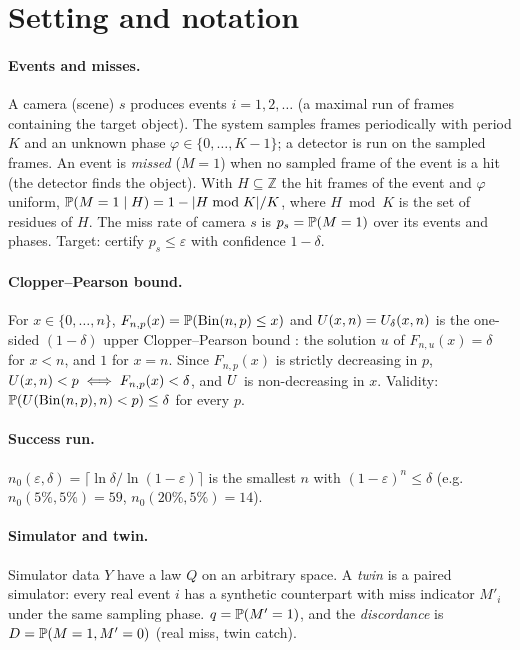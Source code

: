 \section{Setting and notation}\label{sec:setting}

\paragraph{Events and misses.} A camera (scene) $s$ produces events $i=1,2,\dots$ (a maximal run of frames containing
the target object). The system samples frames periodically with period $K$ and an unknown phase
$\varphi\in\{0,\dots,K-1\}$; a detector is run on the sampled frames. An event is \emph{missed} ($M=1$) when no
sampled frame of the event is a hit (the detector finds the object). With $H\subseteq\mathbb{Z}$ the hit frames of
the event and $\varphi$ uniform, $\mathbb{P}(M=1\mid H)=1-|H \bmod K|/K$, where $H\bmod K$ is the set of residues of $H$.
The miss rate of camera $s$ is $p_s=\mathbb{P}(M=1)$ over its events and phases. Target: certify $p_s\le\varepsilon$ with
confidence $1-\delta$.

\paragraph{Clopper--Pearson bound.} For $x\in\{0,\dots,n\}$, $F_{n,p}(x)=\mathbb{P}(\mathrm{Bin}(n,p)\le x)$ and
$U(x,n)=U_\delta(x,n)$ is the one-sided $(1-\delta)$ upper Clopper--Pearson bound
\cite{clopper1934}: the solution $u$ of $F_{n,u}(x)=\delta$ for $x<n$, and $1$ for $x=n$. Since $F_{n,p}(x)$ is
strictly decreasing in $p$, $U(x,n)<p \iff F_{n,p}(x)<\delta$, and $U$ is non-decreasing in $x$. Validity:
$\mathbb{P}(U(\mathrm{Bin}(n,p),n)<p)\le\delta$ for every $p$.

\paragraph{Success run.} $n_0(\varepsilon,\delta)=\lceil \ln\delta/\ln(1-\varepsilon)\rceil$ is the smallest $n$ with
$(1-\varepsilon)^n\le\delta$ (e.g.\ $n_0(5\%,5\%)=59$, $n_0(20\%,5\%)=14$).

\paragraph{Simulator and twin.} Simulator data $Y$ have a law $Q$ on an arbitrary space. A \emph{twin} is a paired
simulator: every real event $i$ has a synthetic counterpart with miss indicator $M'_i$ under the same sampling phase.
$q=\mathbb{P}(M'=1)$, and the \emph{discordance} is $D=\mathbb{P}(M=1,M'=0)$ (real miss, twin catch).

